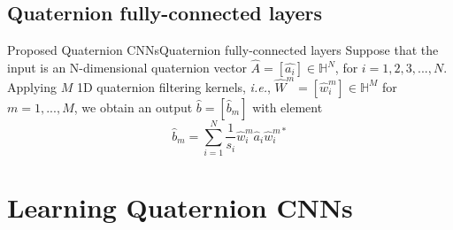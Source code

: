 \documentclass{beamer}
\begin{document}
\subsection{Quaternion fully-connected layers}
\begin{frame}{Proposed Quaternion CNNs}{Quaternion fully-connected layers}
Suppose that the input is an N-dimensional quaternion vector $\hat{A}=[\hat{a_i}]\in \mathbb{H}^N$, for $i=1,2,3,...,N$. Applying $M$ 1D quaternion filtering kernels, \emph{i.e.}, $\hat{W}^m=[\hat{w}^m_i]\in\mathbb{H}^M$ for $m=1,...,M$, we obtain an output $\hat{b}=[\hat{b}_m]$ with element
\begin{equation}
    \hat{b}_m=\sum_{i=1}^N\frac{1}{s_i}\hat{w}^m_i  \hat{a}_i   \hat{w}_i^{m*}
\end{equation}
\end{frame}




\section{Learning Quaternion CNNs}
\end{document}
